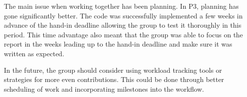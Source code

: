 The main issue when working together has been planning.
In P3, planning has gone significantly better.
The code was successfully implemented a few weeks in advance of the hand-in deadline allowing the group to test it
thoroughly in this period.
This time advantage also meant that the group was able to focus on the report in the weeks leading up to the hand-in
deadline and make sure it was written as expected.

In the future, the group should consider using workload tracking tools or strategies for more even contributions.
This could be done through better scheduling of work and incorporating milestones into the workflow.
